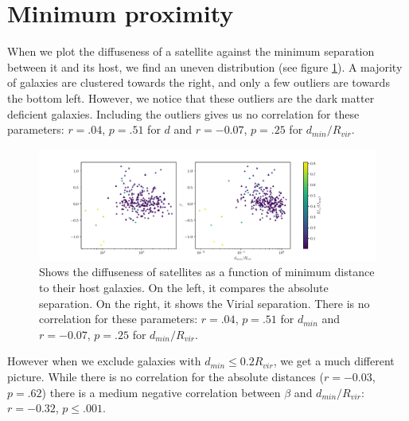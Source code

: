 \section{Minimum proximity}

When we plot the diffuseness of a satellite against the minimum separation between it and its host, we find an uneven distribution (see figure \ref{fig:beta-dmin}). A majority of galaxies are clustered towards the right, and only a few outliers are towards the bottom left. However, we notice that these outliers are the dark matter deficient galaxies. Including the outliers gives us no correlation for these parameters: $r = .04$, $p=.51$ for $d$ and $r = -0.07$, $p = .25$ for $d_{min} / R_{vir}$.
\begin{figure}
    \centering
    \includegraphics*[width=\textwidth*11/10]{figs/me/beta-dmin.pdf}
    \caption{Shows the diffuseness of satellites as a function of minimum distance to their host galaxies. On the left, it compares the absolute separation. On the right, it shows the Virial separation. There is no correlation for these parameters: $r = .04$, $p=.51$ for $d_{min}$ and $r = -0.07$, $p = .25$ for $d_{min} / R_{vir}$.}
    \label{fig:beta-dmin}
\end{figure}

However when we exclude galaxies with $d_{min} \leq 0.2 R_{vir}$, we get a much different picture. While there is no correlation for the absolute distances ($r = -0.03$, $p = .62$) there is a medium negative correlation between $\beta$ and $d_{min}/R_{vir}$: $r=-0.32$, $p \leq .001$.

